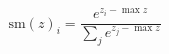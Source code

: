 \documentclass{article}
\begin{document}
\begin{preview}

\[ \mathrm{sm}(z)_i = \dfrac{e^{z_i - \max z}}{\sum_j e^{z_j - \max z}} \]

\end{preview}
\end{document}
